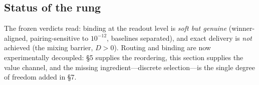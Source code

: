 \subsection{Status of the rung}
\label{sec:status6}

The frozen verdicts read: binding at the readout level is \emph{soft but
genuine} (winner-aligned, pairing-sensitive to $10^{-12}$, baselines
separated), and exact delivery is \emph{not} achieved (the mixing barrier,
$D>0$). Routing and binding are now experimentally decoupled: §5 supplies
the reordering, this section supplies the value channel, and the missing
ingredient---discrete selection---is the single degree of freedom added in
§7.

